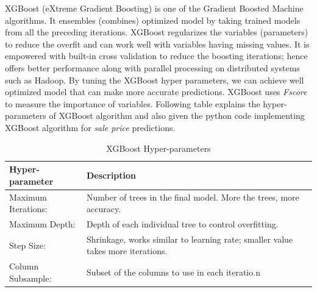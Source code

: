 \documentclass[sigconf]{acmart}
\begin{document}
	XGBoost (eXtreme Gradient Boosting) is one of the Gradient Boosted Machine algorithms. It ensembles (combines) optimized model by taking trained models from all the preceding iterations. XGBoost regularizes the variables (parameters) to reduce the overfit and can work well with variables having missing values. It is empowered with built-in cross validation to reduce the boosting iterations; hence offers better performance along with parallel processing on distributed systems such as Hadoop. By tuning the XGBoost hyper parameters, we can achieve well optimized model that can make more accurate predictions. XGBoost uses {\em Fscore} to measure the importance of  variables. Following table explains the hyper-parameters of XGBoost algorithm and also given the python code implementing XGBoost algorithm for {\em sale price} predictions.
	
	\begin{table}[H]
		\center
		\caption{XGBoost Hyper-parameters}
		\label{tab:xgb_param}		
		\begin{tabular}{l p{5cm}}
			\toprule
			Hyper-parameter & Description \\
			\midrule
			Maximum Iterations: & Number of trees in the final model. More the trees, more accuracy. \\
			
			Maximum Depth: & Depth of each individual tree to control overfitting. \\
			
			Step Size: & Shrinkage, works similar to learning rate; smaller value takes more iterations. \\
			
			Column Subsample: & Subset of the columns to use in each iteratio.n \\ 
			\bottomrule
		\end{tabular}
	\end{table}
	
\end{document}
